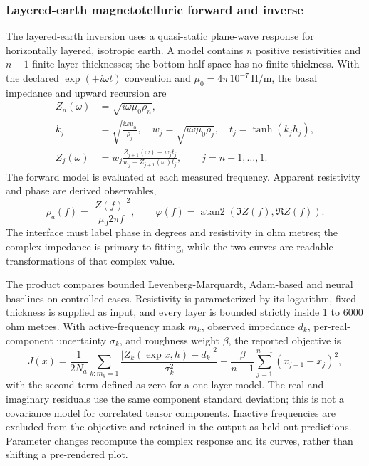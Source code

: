 \subsubsection{Layered-earth magnetotelluric forward and inverse}\label{method-mt-inversion}

The layered-earth inversion uses a quasi-static plane-wave response for horizontally layered,
isotropic earth. A model contains \(n\) positive resistivities and
\(n-1\) finite layer thicknesses; the bottom half-space has no finite
thickness. With the declared \(\exp(+i\omega t)\) convention and
\(\mu_0=4\pi\,10^{-7}\,\mathrm{H/m}\), the basal impedance and upward
recursion are
\begin{align}\label{eq:mt-recursion}
 Z_n(\omega)&=\sqrt{i\omega\mu_0\rho_n},\\
 k_j&=\sqrt{\frac{i\omega\mu_0}{\rho_j}},\quad
 w_j=\sqrt{i\omega\mu_0\rho_j},\quad t_j=\tanh(k_jh_j),\\
 Z_j(\omega)&=w_j\frac{Z_{j+1}(\omega)+w_jt_j}
 {w_j+Z_{j+1}(\omega)t_j},\qquad j=n-1,\ldots,1.
\end{align}
The forward model is evaluated at each measured frequency. Apparent
resistivity and phase are derived observables,
\begin{equation}\label{eq:mt-observables}
 \rho_a(f)=\frac{|Z(f)|^2}{\mu_0 2\pi f},\qquad
 \varphi(f)=\operatorname{atan2}(\Im Z(f),\Re Z(f)).
\end{equation}
The interface must label phase in degrees and resistivity in ohm metres;
the complex impedance is primary to fitting, while the two curves are
readable transformations of that complex value.

The product compares bounded Levenberg-Marquardt, Adam-based and neural
baselines on controlled cases. Resistivity is parameterized by its
logarithm, fixed thickness is supplied as input, and every layer is
bounded strictly inside 1 to 6000 ohm metres. With active-frequency mask
\(m_k\), observed impedance \(d_k\), per-real-component uncertainty
\(\sigma_k\), and roughness weight \(\beta\), the reported objective is
\begin{equation}\label{eq:mt-objective}
 J(x)=\frac{1}{2N_a}\sum_{k:m_k=1}
 \frac{|Z_k(\exp x,h)-d_k|^2}{\sigma_k^2}
 +\frac{\beta}{n-1}\sum_{j=1}^{n-1}(x_{j+1}-x_j)^2,
\end{equation}
with the second term defined as zero for a one-layer model. The real and
imaginary residuals use the same component standard deviation; this is
not a covariance model for correlated tensor components. Inactive
frequencies are excluded from the objective and retained in the output
as held-out predictions. Parameter changes recompute the complex
response and its curves, rather than shifting a pre-rendered plot.

